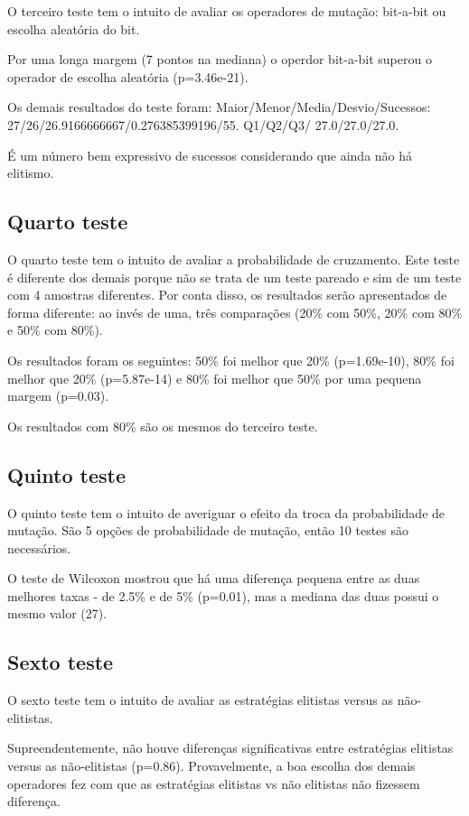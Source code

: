 \documentclass[11pt]{article}
\begin{document}
O terceiro teste tem o intuito de avaliar os operadores de mutação: bit-a-bit ou escolha aleatória do bit.

Por uma longa margem (7 pontos na mediana) o operdor bit-a-bit superou o operador de escolha aleatória (p=3.46e-21).

Os demais resultados do teste foram: Maior/Menor/Media/Desvio/Sucessos: 27/26/26.9166666667/0.276385399196/55. Q1/Q2/Q3/ 27.0/27.0/27.0.

É um número bem expressivo de sucessos considerando que ainda não há elitismo.

\subsection{Quarto teste}

O quarto teste tem o intuito de avaliar a probabilidade de cruzamento. Este
teste é diferente dos demais porque não se trata de um teste pareado e sim de
um teste com 4 amostras diferentes. Por conta disso, os resultados serão
apresentados de forma diferente: ao invés de uma, três comparações (20\% com
50\%, 20\% com 80\% e 50\% com 80\%).

Os resultados foram os seguintes: 50\% foi melhor que 20\% (p=1.69e-10), 80\%
foi melhor que 20\% (p=5.87e-14) e 80\% foi melhor que 50\% por uma pequena
margem (p=0.03).

Os resultados com 80\% são os mesmos do terceiro teste.

\subsection{Quinto teste}

O quinto teste tem o intuito de averiguar o efeito da troca da probabilidade de
mutação. São 5 opções de probabilidade de mutação, então 10 testes são
necessários.

O teste de Wilcoxon mostrou que há uma diferença pequena entre as duas melhores
taxas - de 2.5\% e de 5\%  (p=0.01), mas a mediana das duas possui o mesmo
valor (27).

\subsection{Sexto teste}

O sexto teste tem o intuito de avaliar as estratégias elitistas versus as não-elitistas.

Supreendentemente, não houve diferenças significativas entre estratégias
elitistas versus as não-elitistas (p=0.86). Provavelmente, a boa escolha dos
demais operadores fez com que as estratégias elitistas vs não elitistas não
fizessem diferença.
\end{document}
